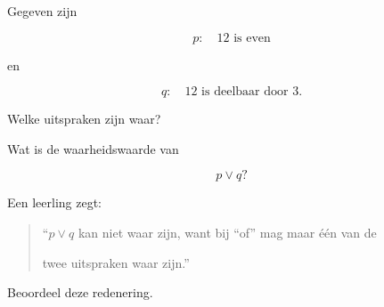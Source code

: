\documentclass{ximera}
\begin{document}
\begin{oefening}{\oefB \ESS}

Gegeven zijn

\[
p:\quad 12\text{ is even}
\]

en

\[
q:\quad 12\text{ is deelbaar door }3.
\]

\begin{question}

Welke uitspraken zijn waar?

\begin{multipleChoice}





\end{multipleChoice}

\end{question}



\begin{question}

Wat is de waarheidswaarde van

\[
p\lor q?
\]

\begin{multipleChoice}



\end{multipleChoice}

\end{question}



\begin{question}

Een leerling zegt:

\begin{quote}

``$p\lor q$ kan niet waar zijn, want bij ``of'' mag maar één van de

twee uitspraken waar zijn.''

\end{quote}

Beoordeel deze redenering.

\begin{oplossing}


\end{oplossing}
\end{question}
\end{oefening}
\end{document}

